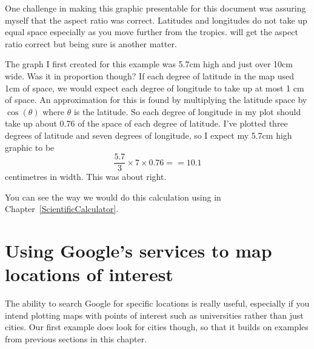 One challenge in making this graphic presentable for this document  
was assuring myself that the aspect ratio was correct. Latitudes and longitudes do not take up equal space especially as you move further from the tropics. \R{} will get the aspect ratio correct but being sure is another matter.  
 
The graph I first created for this example was 5.7cm high and just over 10cm wide. Was it in proportion though? If each degree of latitude in the map used 1cm of space, we would expect each degree of longitude to take up at most 1 cm of space. An approximation for this is found by multiplying the latitude space by $\cos(\theta)$ where $\theta$ is the latitude. So each degree of longitude in my plot should take up about 0.76 of the space of each degree of latitude. I've plotted three degrees of latitude and seven degrees of longitude, so I expect my 5.7cm high graphic to be  
$$ \frac{5.7}{3} \times 7 \times 0.76 == 10.1 $$ 
centimetres in width. This was about right.  
 
You can see the way we would do this calculation using \R{} in Chapter~\ref{ScientificCalculator}. 
 
 
\section{Using Google's services to map locations of interest} 
 
The ability to search Google for specific locations is really useful, especially if you intend plotting maps with points of interest such as universities rather than just cities. Our first example does look for cities though, so that it builds on examples from previous sections in this chapter. 
 
